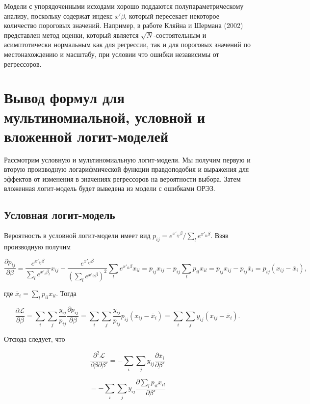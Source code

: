 Модели с упорядоченными исходами хорошо поддаются полупараметрическому анализу, поскольку содержат индекс $x'\beta $, который пересекает некоторое количество пороговых значений. Например, в работе Кляйна и Шермана (2002) представлен метод оценки, который является $\sqrt{N}$-состоятельным и асимптотически нормальным как для регрессии, так и для пороговых значений по местонахождению и масштабу, при условии что ошибки независимы от регрессоров. 

\section{Вывод формул для мультиномиальной, условной и вложенной логит-моделей}

Рассмотрим условную и мультиномиальную логит-модели. Мы получим первую и вторую производную логарифмической функции правдоподобия и выражения для эффектов от изменения в значениях регрессоров на вероятности выбора. Затем вложенная логит-модель будет выведена из модели с ошибками ОРЭЗ.

\subsection{Условная логит-модель}

Вероятность в условной логит-модели имеет вид $p_{ij}={e^{x'_{ij}\beta }}/{\sum_l{e^{x'_{il}\beta }}}$. Взяв производную получим

\[\frac{\partial p_{ij}}{\partial \beta }=\frac{e^{x'_{ij}\beta }}{\sum_l{e^{x'_i{\beta }_l}}}x_{ij}-\frac{e^{x'_{ij}\beta }}{{\left(\sum_l{e^{x'_{il}\beta }}\right)}^2}\sum_l{e^{x'_{il}\beta }x_{il}}=p_{ij}x_{ij}-p_{ij}\sum_l{p_{il}x_{il}=}p_{ij}x_{ij}-p_{ij}{\overline{x}}_{i}=p_{ij}\left(x_{ij}-{\overline{x}}_i\right),\] 

где ${\overline{x}}_i=\sum_l{p_{il}x_{il}}$. Тогда 

\[\frac{\partial {\mathcal L}}{\partial \beta }=\sum_i{\sum_j{\frac{y_{ij}}{p_{ij}}}\frac{\partial p_{ij}}{\partial \beta }=\sum_i{\sum_j{\frac{y_{ij}}{p_{ij}}p_{ij}(x_{ij}-{\overline{x}}_i)=\sum_i{\sum_j{y_{ij}\left(x_{ij}-{\overline{x}}_i\right).}}}}}\] 

Отсюда следует, что 

\[\frac{{\partial }^2{\mathcal L}}{\partial \beta \partial \beta' }=-\sum_i{\sum_j{y_{ij}\frac{\partial {\overline{x}}_i}{\partial {\beta }'}}}\] 

\[=-\sum_i{\sum_j{y_{ij}\frac{\partial \sum_l{p_{il}x_{il}}}{\partial {\beta }'}}}\] 

